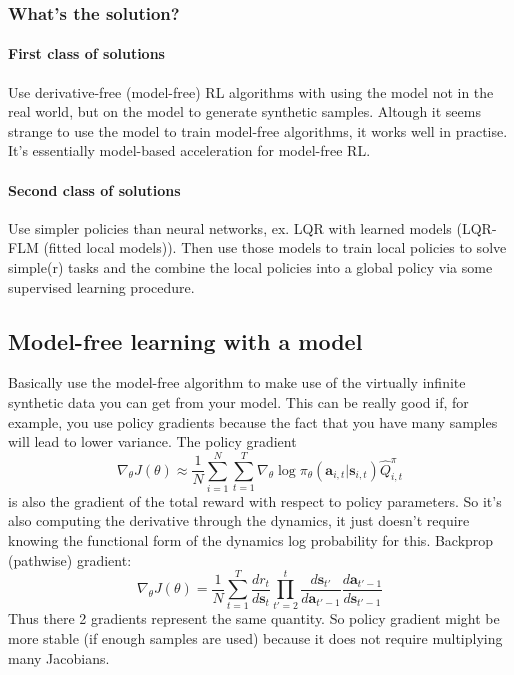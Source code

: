 \documentclass{report}
\begin{document}
\subsubsection{What's the solution?}
\paragraph{First class of solutions}
Use derivative-free (model-free) RL algorithms with using the model not in the real world, but on the model to generate synthetic samples.
Altough it seems strange to use the model to train model-free algorithms, it works well in practise.
It's essentially model-based acceleration for model-free RL.
\paragraph{Second class of solutions}
Use simpler policies than neural networks, ex. LQR with learned models (LQR-FLM (fitted local models)).
Then use those models to train local policies to solve simple(r) tasks and the combine the local policies
into a global policy via some supervised learning procedure.

\subsection{Model-free learning with a model}
Basically use the model-free algorithm to make use of the virtually infinite synthetic data you can get from your model.
This can be really good if, for example, you use policy gradients because the fact that you have many samples will lead to lower variance. 
The policy gradient
\begin{equation}
		\nabla_{\theta} J(\theta) \approx
		\frac{1}{N} \sum_{i=1}^{N} \sum_{t=1}^{T} \nabla_{\theta} \log \pi_\theta (\bm{a}_{i,t}| \bm{s}_{i,t}) \hat{Q}^\pi_{i,t}
\end{equation}
is also the gradient of the total reward with respect to policy parameters.
So it's also computing the derivative through the dynamics, it just doesn't require knowing the functional form of
the dynamics log probability for this.
Backprop (pathwise) gradient:
\begin{equation}
		\nabla_{\theta} J(\theta) =
		\frac{1}{N} \sum_{t=1}^{T} \frac{dr_t}{d\bm{s}_{t}} \prod_{t'=2}^{t} \frac{d\bm{s}_{t'}}{d\bm{a}_{t'-1}} \frac{d\bm{a}_{t'-1}}{d\bm{s}_{t'-1}}  
\end{equation}
Thus there 2 gradients represent the same quantity.
So policy gradient might be more stable (if enough samples are used) because it does not require multiplying many Jacobians.
\end{document}
